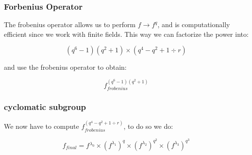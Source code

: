 \documentclass{article}
\begin{document}
\subsubsection{Forbenius Operator}
The frobenius operator allows us to perform \( f \to f^q \), and is computationally efficient since we work with finite fields.
This way we can factorize the power into:

\[ (q^6 - 1)(q^2 +1) \times ( q^4 - q^2 + 1 \div r ) \]

and use the frobenius operator to obtain:

\[ f_{frobenius}^{(q^6 - 1)(q^2 +1)} \]


\subsubsection{cyclomatic subgroup}
We now have to compute \( f_{frobenius}^{( q^4 - q^2 + 1 \div r )} \), to do so we do:

\[ f_{final} = f_{}\limits{ ^{\lambda_0}} \times (f_{} ^ { \lambda_1})^q \times (f_{} ^ { \lambda_2})^{q^2} \times (f_{} ^{\lambda_3})^{q^3}  \]
\end{document}
